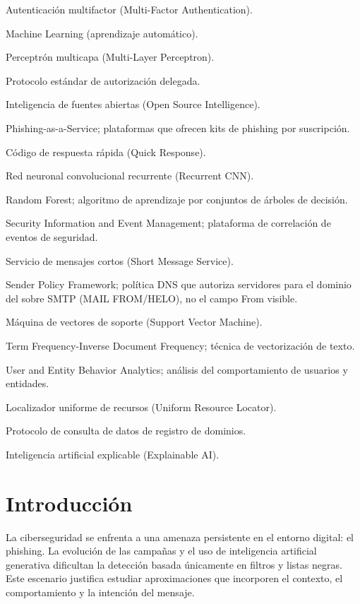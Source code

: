\documentclass[11pt,a4paper,oneside]{report}
\begin{document}
\begin{description}[style=nextline,leftmargin=3.3cm]
  \item[MFA] Autenticación multifactor (Multi-Factor Authentication).
  \item[ML] Machine Learning (aprendizaje automático).
  \item[MLP] Perceptrón multicapa (Multi-Layer Perceptron).
  \item[OAuth] Protocolo estándar de autorización delegada.
  \item[OSINT] Inteligencia de fuentes abiertas (Open Source Intelligence).
  \item[PhaaS] Phishing-as-a-Service; plataformas que ofrecen kits de phishing por suscripción.
  \item[QR] Código de respuesta rápida (Quick Response).
  \item[RCNN] Red neuronal convolucional recurrente (Recurrent CNN).
  \item[RF] Random Forest; algoritmo de aprendizaje por conjuntos de árboles de decisión.
  \item[SIEM] Security Information and Event Management; plataforma de correlación de eventos de seguridad.
  \item[SMS] Servicio de mensajes cortos (Short Message Service).
  \item[SPF] Sender Policy Framework; política DNS que autoriza servidores para el dominio del sobre SMTP (MAIL FROM/HELO), no el campo From visible.
  \item[SVM] Máquina de vectores de soporte (Support Vector Machine).
  \item[TF-IDF] Term Frequency-Inverse Document Frequency; técnica de vectorización de texto.
  \item[UEBA] User and Entity Behavior Analytics; análisis del comportamiento de usuarios y entidades.
  \item[URL] Localizador uniforme de recursos (Uniform Resource Locator).
  \item[WHOIS] Protocolo de consulta de datos de registro de dominios.
  \item[XAI] Inteligencia artificial explicable (Explainable AI).
\end{description}

\chapter{Introducción}

La ciberseguridad se enfrenta a una amenaza persistente en el entorno digital: el phishing. La evolución de las campañas y el uso de inteligencia artificial generativa dificultan la detección basada únicamente en filtros y listas negras. Este escenario justifica estudiar aproximaciones que incorporen el contexto, el comportamiento y la intención del mensaje.
\end{document}
